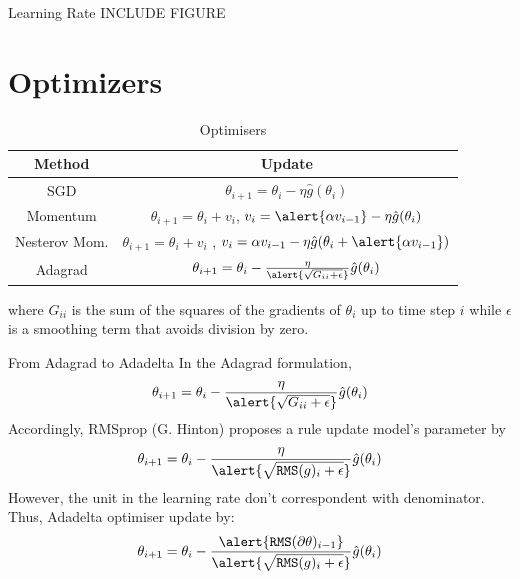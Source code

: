 \documentclass[xcolor=pdftex,dvipsnames,table,mathserif]{beamer}
\begin{document}
\begin{frame}{Learning Rate}
INCLUDE FIGURE
\end{frame}

\section{Optimizers}

\begin{frame}
\begin{table}[htp]
\caption{Optimisers}
\begin{center}
\begin{tabular}{|c|c|} \hline
Method & Update\\ \hline
SGD  & $\theta_{i+1}= \theta_{i}-\eta\hat{g}(\theta_{i})$ \\ \hline
Momentum    & $\theta_{i+1}= \theta_{i}+v_i$, $v_{i}= \alert{\alpha v_{i-1}} -\eta \hat{g}(\theta_{i}) $ \\  \hline
Nesterov Mom.  &  $\theta_{i+1}= \theta_{i}+v_i$ , $v_i= \alpha v_{i-1} -\eta\hat{g}(\theta_{i}+ \alert{\alpha v_{i-1}}) $\\ \hline
Adagrad & $\theta_{i+1}= \theta_{i}- \frac{\eta}{\alert{\sqrt { G_{ii}+\epsilon  }}} \hat{g}(\theta_{i})$  \\ \hline
\end{tabular}
\end{center}
\label{default}
\end{table}%
where $G_{ii}$ is the sum of the squares of the gradients of $\theta_i$ up to time step $i$ while $\epsilon$ is a smoothing term that avoids division by zero.
\end{frame}

\begin{frame}{From Adagrad to Adadelta}
In the Adagrad formulation,
\begin{equation}
\theta_{i+1}= \theta_{i}- \frac{\eta}{\alert{\sqrt { G_{ii}+\epsilon  }}} \hat{g}(\theta_{i})
\end{equation}
Accordingly, RMSprop (G. Hinton) proposes a rule update model's parameter by
\begin{equation}
\theta_{i+1}= \theta_{i}- \frac{\eta}{\alert{\sqrt { \texttt{RMS}(g)_{i}+\epsilon  }}} \hat{g}(\theta_{i})
\end{equation}
However, the unit in the learning rate don't correspondent with denominator. Thus, Adadelta optimiser update by:
\begin{equation}
\theta_{i+1}= \theta_{i}- \frac{\alert{ \texttt{RMS}(\partial\theta)_{i-1}}}{\alert{\sqrt { \texttt{RMS}(g)_{i}+\epsilon  }}} \hat{g}(\theta_{i})
\end{equation}
\end{frame}
\end{document}
